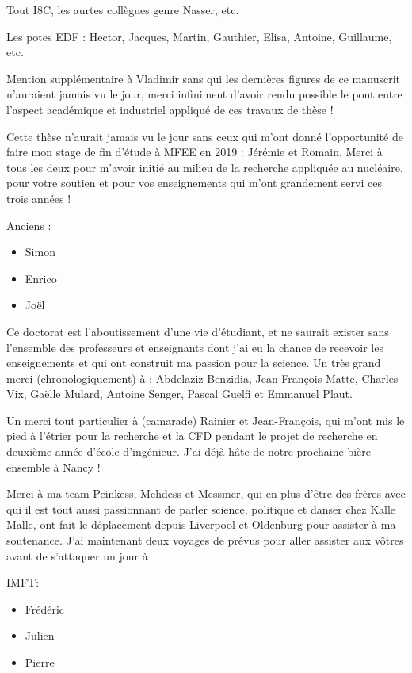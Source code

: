 Tout I8C, les aurtes collègues genre Nasser, etc.

Les potes EDF : Hector, Jacques, Martin, Gauthier, Elisa, Antoine, Guillaume, etc.



Mention supplémentaire à Vladimir sans qui les dernières figures de ce manuscrit n'auraient jamais vu le jour, merci infiniment d'avoir rendu possible le pont entre l'aspect académique et industriel appliqué de ces travaux de thèse !

Cette thèse n'aurait jamais vu le jour sans ceux qui m'ont donné l'opportunité de faire mon stage de fin d'étude à MFEE en 2019 : Jérémie et Romain. Merci à tous les deux pour m'avoir initié au milieu de la recherche appliquée au nucléaire, pour votre soutien et pour vos enseignements qui m'ont grandement servi ces trois années !

Anciens :

\begin{itemize}
\item Simon
\item Enrico
\item Joël
\end{itemize}


Ce doctorat est l'aboutissement d'une vie d'étudiant, et ne saurait exister sans l'ensemble des professeurs et enseignants dont j'ai eu la chance de recevoir les enseignements et qui ont construit ma passion pour la science. Un très grand merci (chronologiquement) à : Abdelaziz Benzidia, Jean-François Matte, Charles Vix, Gaëlle Mulard, Antoine Senger, Pascal Guelfi et Emmanuel Plaut. 

Un merci tout particulier à (camarade) Rainier et Jean-François, qui m'ont mis le pied à l'étrier pour la recherche et la CFD pendant le projet de recherche en deuxième année d'école d'ingénieur. J'ai déjà hâte de notre prochaine bière ensemble à Nancy !






Merci à ma team Peinkess, Mehdess et Messmer, qui en plus d'être des frères avec qui il est tout aussi passionnant de parler science, politique et danser chez Kalle Malle, ont fait le déplacement depuis Liverpool et Oldenburg pour assister à ma soutenance. J'ai maintenant deux voyages de prévus pour aller assister aux vôtres avant de s'attaquer un jour à 

IMFT:

\begin{itemize}
\item Frédéric
\item Julien
\item Pierre
\end{itemize}

